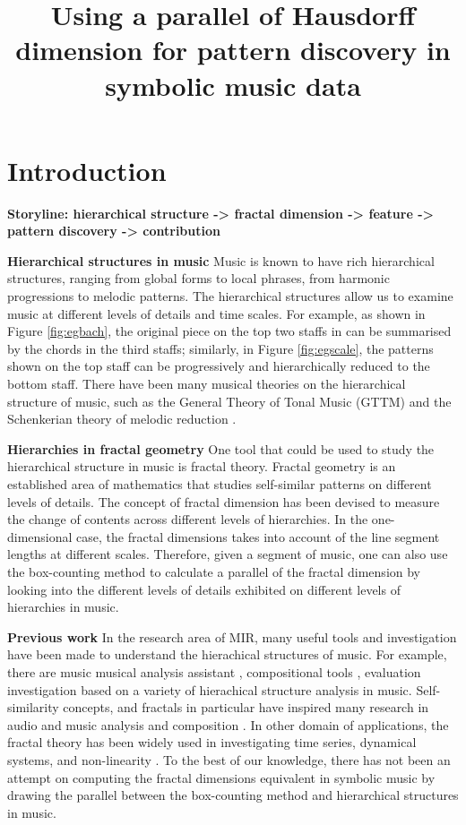 \documentclass{article}
\title{Using a parallel of Hausdorff dimension for pattern discovery in symbolic music data}
\begin{document}
\section{Introduction}
\label{sec:intro}

\textbf{Storyline: hierarchical structure -> fractal dimension -> feature -> pattern discovery -> contribution }

\textbf{Hierarchical structures in music}
Music is known to have rich hierarchical structures, ranging from global forms to local phrases, from harmonic progressions to melodic patterns. 
The hierarchical structures allow us to examine music at different levels of details and time scales. For example, as shown in Figure \ref{fig:egbach}, the original piece on the top two staffs in can be summarised by the chords in the third staffs; similarly, in Figure \ref{fig:egscale}, the patterns shown on the top staff can be progressively and hierarchically reduced to the bottom staff. 
There have been many musical theories on the hierarchical structure of music, such as the General Theory of Tonal Music (GTTM) \cite{lerdahl1985generative} and the Schenkerian theory of melodic reduction \cite{forte1959schenker}.

\textbf{Hierarchies in fractal geometry}
One tool that could be used to study the hierarchical structure in music is fractal theory.
Fractal geometry is an established area of mathematics that studies self-similar patterns on different levels of details.
The concept of fractal dimension has been devised to measure the change of contents across different levels of hierarchies.
In the one-dimensional case, the fractal dimensions takes into account of the line segment lengths at different scales.
Therefore, given a segment of music, one can also use the box-counting method to calculate a parallel of the fractal dimension by looking into the different levels of details exhibited on different levels of hierarchies in music.

\textbf{Previous work}
In the research area of MIR, many useful tools and investigation have been made to understand the hierachical structures of music.
For example, there are music musical analysis assistant \cite{hamanaka2009interactive, hamanaka2005atta}, compositional tools \cite{hamanaka2004automatic, hamanaka2005automatic}, evaluation investigation \cite{mcfee2017evaluating, mcfee2015hierarchical} based on a variety of hierachical structure analysis in music.
Self-similarity concepts, and fractals in particular have inspired many research in audio and music analysis \cite{bigerelle2000fractal,hsu1990fractal,hsu1991self} and composition \cite{sukumaran2009generation,leach1995nature}.
In other domain of applications, the fractal theory has been widely used in investigating time series, dynamical systems, and non-linearity \cite{accardo1997use, higuchi1988approach}.
To the best of our knowledge, there has not been an attempt on computing the fractal dimensions equivalent in symbolic music by drawing the parallel between the box-counting method and hierarchical structures in music. 
\end{document}
